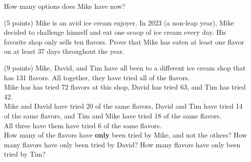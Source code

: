\documentclass[11pt]{article}
\begin{document}
\begin{problem}
\begin{ppart}
     How many options does Mike have now?

    
 \end{ppart}
 \end{problem}

 \begin{problem}
 
 \begin{ppart} (5 points)
     Mike is an avid ice cream enjoyer. In 2023 (a non-leap year), Mike decided to challenge himself and eat one scoop of ice cream every day. His favorite shop only sells ten flavors. Prove that Mike has eaten at least one flavor on at least 37 days throughout the year.

   
\end{ppart}

\begin{ppart} (9 points) Mike, David, and Tim have all been to a different ice cream shop that has 131 flavors. All together, they have tried all of the flavors.\\

Mike has has tried 72 flavors at this shop, David has tried 63, and Tim has tried 42.\\

Mike and David have tried 20 of the same flavors, David and Tim have tried 14 of the same flavors, and Tim and Mike have tried 18 of the same flavors. \\

All three have them have tried 6 of the same flavors. \\

How many of the flavors have \textbf{only} been tried by Mike, and not the others? How many flavors have only been tried by David? How many flavors have only been tried by Tim?
\end{ppart}
 \end{problem}
 
\end{document}
